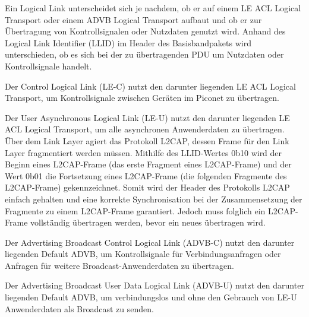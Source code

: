 Ein Logical Link unterscheidet sich je nachdem, ob er auf einem LE ACL Logical Transport oder einem ADVB Logical Transport aufbaut und ob er zur Übertragung von Kontrollsignalen oder Nutzdaten genutzt wird. Anhand des Logical Link Identifier (LLID) im Header des Basisbandpakets wird unterschieden, ob es sich bei der zu übertragenden PDU um Nutzdaten oder Kontrollsignale handelt.

Der Control Logical Link (LE-C) nutzt den darunter liegenden LE ACL Logical Transport, um Kontrollsignale zwischen Geräten im Piconet zu übertragen.

Der User Asynchronous Logical Link (LE-U) nutzt den darunter liegenden LE ACL Logical Transport, um alle asynchronen Anwenderdaten zu übertragen. Über dem Link Layer agiert das Protokoll L2CAP, dessen Frame für den Link Layer fragmentiert werden müssen. Mithilfe des LLID-Wertes 0b10 wird der Beginn eines L2CAP-Frame (das erste Fragment eines L2CAP-Frame) und der Wert 0b01 die Fortsetzung eines L2CAP-Frame (die folgenden Fragmente des L2CAP-Frame) gekennzeichnet. Somit wird der Header des Protokolls L2CAP einfach gehalten und eine korrekte Synchronisation bei der Zusammensetzung der Fragmente zu einem L2CAP-Frame garantiert. Jedoch muss folglich ein L2CAP-Frame vollständig übertragen werden, bevor ein neues übertragen wird.

Der Advertising Broadcast Control Logical Link (ADVB-C) nutzt den darunter liegenden Default ADVB, um Kontrollsignale für Verbindungsanfragen oder Anfragen für weitere Broadcast-Anwenderdaten zu übertragen.

Der Advertising Broadcast User Data Logical Link (ADVB-U) nutzt den darunter liegenden Default ADVB, um verbindungslos und ohne den Gebrauch von LE-U Anwenderdaten als Broadcast zu senden. \cite{BtSpec4.0_176-177}
